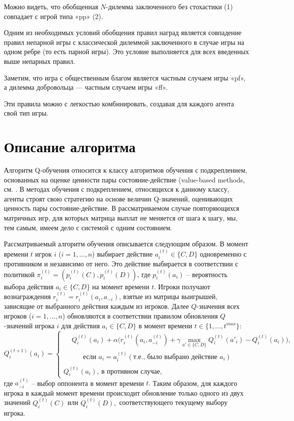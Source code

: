 \documentclass[12pt]{extarticle}
\begin{document}
Можно видеть, что обобщенная $N$-дилемма заключенного без стохастики (1) совпадает с игрой типа «pp» (2).

Одним из необходимых условий обобщения правил наград является совпадение правил непарной игры с классической дилеммой заключенного в случае игры на одном ребре (то есть парной игры). Это условие выполняется для всех введенных выше непарных правил.

Заметим, что игра с общественным благом является частным случаем игры «pf», а дилемма добровольца --- частным случаем игры «ff».

Эти правила можно с легкостью комбинировать, создавая для каждого агента свой тип игры.

\section{Описание алгоритма}

Алгоритм Q-обучения \cite{watkins1992q} относится к классу алгоритмов обучения с подкреплением, основанных на оценке ценности пары состояние-действие (value-based methods, см. \cite{sutton2018reinforcement}. В методах обучения с подкреплением, относящихся к данному классу, агенты строят свою стратегию на основе величин Q-значений, оценивающих ценность пары состояние-действие. В рассматриваемом случае повторяющихся матричных игр, для которых матрица выплат не меняется от шага к шагу, мы, тем самым, имеем дело с системой с одним состоянием. 

Рассматриваемый алгоритм обучения описывается следующим образом. В момент времени $t$ игрок $i$ ($i=1,...,n$)  выбирает действие $a^{(t)}_i\in\{C,D\}$ одновременно с противником и независимо от него. Это действие выбирается в соответствии с политикой $\pi_i^{(t)} = \left(p^{(t)}_i(C), p^{(t)}_i(D)\right)$, где $p^{(t)}_i(a_i)$ -- вероятность выбора действия $a_i\in\{C,D\}$ на момент времени $t$. Игроки получают вознаграждения $r_i^{(t)} = r_i^{(t)}(a_i,a_{-i})$, взятые из матрицы выигрышей, зависящие от выбранного действия каждым из игроков. Далее $Q$-значения всех игроков ($i=1,...,n$) обновляются в соответствии правилом обновления $Q$-значений игрока $i$ для действия $a_i\in\{C,D\}$ в момент времени $t\in\{1,...,t^{max}\}$:
\begin{equation}\label{eq1_1}
	Q^{(t+1)}_i(a_i) = 
	\begin{cases}
		\begin{split}
			&Q^{(t)}_i(a_i) + \alpha \Big(r^{(t)}_i(a_i,a^{(t)}_{-i}) + \gamma \max_{a'\in\{C,D\} } Q^{(t)}_i(a'_i) - Q^{(t)}_i(a_i)\Big),\\
			&\;\;\;\;\;\; \text{если } a_i=a^{(t)}_i (\text{т.е., было выбрано действие $a_i$})
		\end{split}
		\\
		Q^{(t)}_i(a_i),\ \text{в противном случае,}
	\end{cases}
\end{equation}
где $a^{(t)}_{-i}$ -- выбор оппонента в момент времени $t.$ Таким образом, для каждого игрока в каждый момент времени происходит обновление только одного из двух значений $Q_i^{(t)}(C)$ или $Q_i^{(t)}(D),$ соответствующего текущему выбору игрока.  
\end{document}
